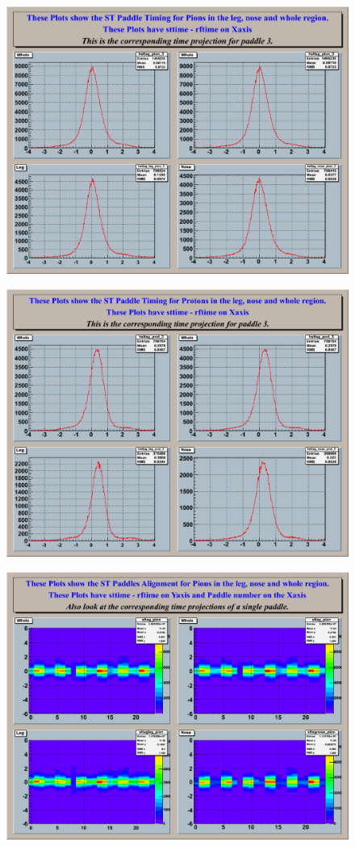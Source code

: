 \begin{figure}[htbp]\begin{center}
\includegraphics[width=0.65\columnwidth]{figures/calib/st/Hpad3_sttag_pion.eps}
\caption[]{\label{fig:calib.st.timepion}}
\end{center}\end{figure}

\begin{figure}[htbp]\begin{center}
\includegraphics[width=0.65\columnwidth]{figures/calib/st/Hpad3_sttag_prot.eps}
\caption[]{\label{fig:calib.st.timeproton}}
\end{center}\end{figure}

\begin{figure}[htbp]\begin{center}
\includegraphics[width=0.6\columnwidth]{figures/calib/st/Hsttag_pion.eps}
\caption[]{\label{fig:calib.st.timepion2d}}
\end{center}\end{figure}

